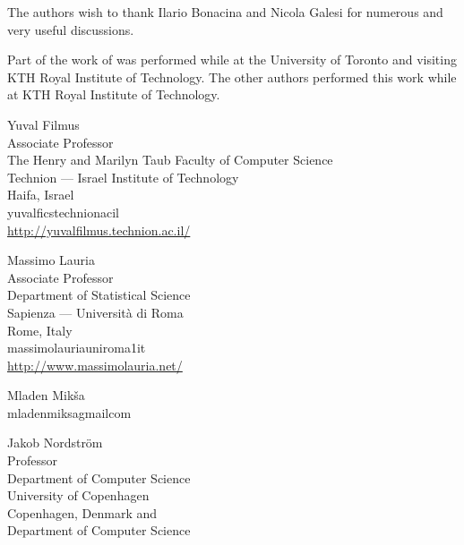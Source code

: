 \documentclass{toc}
\begin{document}
The authors wish to thank Ilario Bonacina and Nicola Galesi
for numerous and very useful discussions.

Part of the work of \theauthorYF was performed while at the University
of Toronto and visiting KTH Royal Institute of Technology.
%
The other authors performed this work while at KTH Royal Institute of
Technology.
 


%
%
%
%
%


%
%
%
%
%

%

\begin{tocauthors}
\begin{tocinfo}[filmus]
  Yuval Filmus \\
  Associate Professor \\
  The Henry and Marilyn Taub Faculty of Computer Science \\
  Technion --- Israel Institute of Technology \\
  Haifa, Israel \\
  yuvalfi\tocat{}cs\tocdot{}technion\tocdot{}ac\tocdot{}il \\
  \url{http://yuvalfilmus.technion.ac.il/}
\end{tocinfo}
\begin{tocinfo}[lauria]
  Massimo Lauria\\
  Associate Professor\\
  Department of Statistical Science\\
  Sapienza --- Università di Roma\\
  Rome, Italy\\
  massimo\tocdot{}lauria\tocat{}uniroma1\tocdot{}it \\   %
 \url{http://www.massimolauria.net/}      %
\end{tocinfo}
\begin{tocinfo}[miksa]
  Mladen Mik\v{s}a\\
  mladen\tocdot{}miksa\tocat{}gmail\tocdot{}com
\end{tocinfo}
\begin{tocinfo}[nordstrom]
  Jakob Nordström\\
  Professor\\
  Department of Computer Science\\
  University of Copenhagen\\
  Copenhagen, Denmark and\\
%
  Department of Computer Science\\

\end{tocinfo}
\end{tocauthors}
\end{document}
